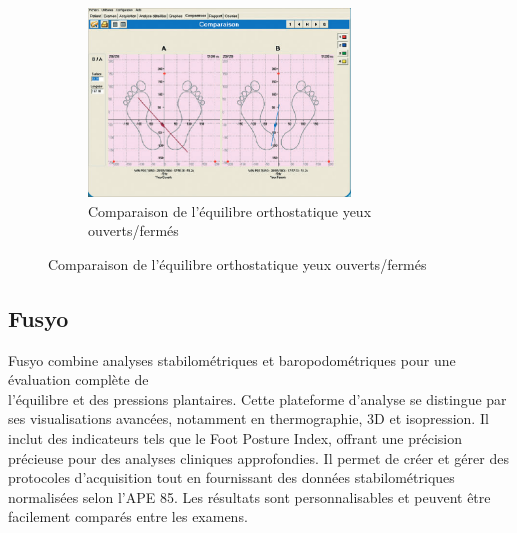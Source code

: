 \begin{figure}[ht]
\begin{subfigure}[b]{0.5\textwidth}
        \centering
        \includegraphics[height=5cm]{images/analyse_marche/comparaison_yo_yf.png}
        \caption{Comparaison de l'équilibre orthostatique yeux ouverts/fermés}\label{fig:winposture_comparaison_yo_yf}
    \end{subfigure}
\end{figure}

\subsection{Fusyo}

Fusyo combine analyses stabilométriques et baropodométriques pour une évaluation complète de \\ l'équilibre et des pressions plantaires. 
Cette plateforme d'analyse se distingue par ses visualisations avancées, notamment en thermographie, 3D et isopression. 
Il inclut des indicateurs tels que le Foot Posture Index, offrant une précision précieuse pour des analyses cliniques approfondies. 
Il permet de créer et gérer des protocoles d'acquisition tout en fournissant des données stabilométriques normalisées selon l'APE 85. 
Les résultats sont personnalisables et peuvent être facilement comparés entre les examens.


